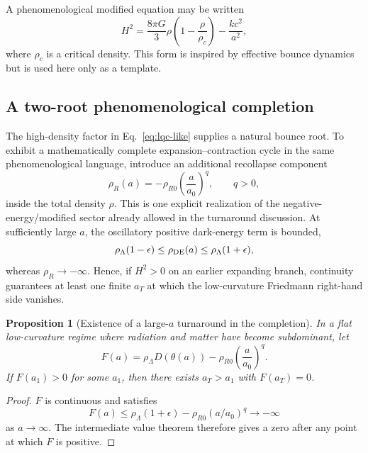 \documentclass[11pt]{article}
\newtheorem{proposition}{Proposition}
\theoremstyle{remark}
\begin{document}
A phenomenological modified equation may be written
\begin{equation}
    H^2=\frac{8\pi G}{3}\rho\left(1-\frac{\rho}{\rho_c}\right)-\frac{kc^2}{a^2},
    \label{eq:lqc-like}
\end{equation}
where $\rho_c$ is a critical density. This form is inspired by effective bounce dynamics but is used here only as a template.


\subsection{A two-root phenomenological completion}
The high-density factor in Eq.~\eqref{eq:lqc-like} supplies a natural bounce root. To exhibit a mathematically complete expansion--contraction cycle in the same phenomenological language, introduce an additional recollapse component
\begin{equation}
 \rho_R(a)=-\rho_{R0}\left(\frac{a}{a_0}\right)^q,
 \qquad q>0,
 \label{eq:negative-recollapse}
\end{equation}
inside the total density $\rho$. This is one explicit realization of the negative-energy/modified sector already allowed in the turnaround discussion. At sufficiently large $a$, the oscillatory positive dark-energy term is bounded,
\begin{equation}
 \rho_\Lambda(1-\epsilon)
 \le \rho_{\rm DE}(a)
 \le \rho_\Lambda(1+\epsilon),
\end{equation}
whereas $\rho_R\to-\infty$. Hence, if $H^2>0$ on an earlier expanding branch, continuity guarantees at least one finite $a_T$ at which the low-curvature Friedmann right-hand side vanishes.

\begin{proposition}[Existence of a large-$a$ turnaround in the completion]
In a flat low-curvature regime where radiation and matter have become subdominant, let
\begin{equation}
 F(a)=\rho_\Lambda D(\theta(a))
 -\rho_{R0}\left(\frac{a}{a_0}\right)^q.
\end{equation}
If $F(a_1)>0$ for some $a_1$, then there exists $a_T>a_1$ with $F(a_T)=0$.
\end{proposition}

\begin{proof}
$F$ is continuous and satisfies
\begin{equation}
 F(a)\le\rho_\Lambda(1+\epsilon)
 -\rho_{R0}(a/a_0)^q\longrightarrow-\infty
\end{equation}
as $a\to\infty$. The intermediate value theorem therefore gives a zero after any point at which $F$ is positive.
\end{proof}
\end{document}
